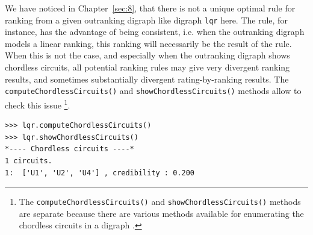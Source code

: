 We have noticed in Chapter~\ref{sec:8}, that there is not a unique optimal rule for ranking from a given outranking digraph like digraph \texttt{lqr} here. The \Copeland rule, for instance, has the advantage of being \Condorcet consistent, i.e. when the outranking digraph models a linear ranking, this ranking will necessarily be the result of the \Copeland rule. When this is not the case, and especially when the outranking digraph shows chordless circuits, all potential ranking rules may give very divergent ranking results, and sometimes substantially divergent rating-by-ranking results. The \texttt{computeChordlessCircuits()} and \texttt{showChordlessCircuits()} methods allow to check this issue \footnote{The \texttt{computeChordlessCircuits()} and \texttt{showChordlessCircuits()} methods are separate because there are various methods available for enumerating the chordless circuits in a digraph \citep{BIS-2010}.}.
\begin{lstlisting}
>>> lqr.computeChordlessCircuits()
>>> lqr.showChordlessCircuits()
*---- Chordless circuits ----*
1 circuits.
1:  ['U1', 'U2', 'U4'] , credibility : 0.200
\end{lstlisting}

